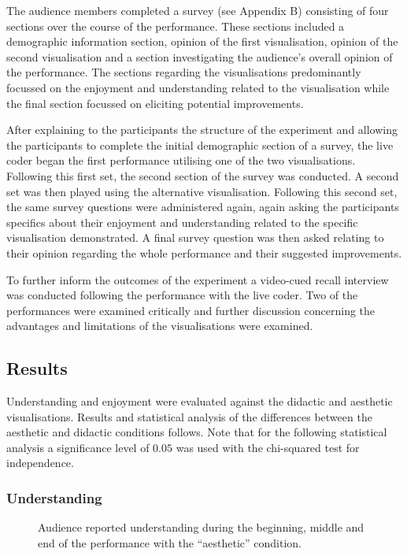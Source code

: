\documentclass{sig-alternate}
\begin{document}
The audience members completed a survey (see Appendix B) consisting of four sections over the course of the performance. These sections included a demographic information section, opinion of the first visualisation, opinion of the second visualisation and a section investigating the audience's overall opinion of the performance. The sections regarding the visualisations predominantly focussed on the enjoyment and understanding related to the visualisation while the final section focussed on eliciting potential improvements.

After explaining to the participants the structure of the experiment and allowing the participants to complete the initial demographic section of a survey, the live coder began the first performance utilising one of the two visualisations. Following this first set, the second section of the survey was conducted. A second set was then played using the alternative visualisation. Following this second set, the same survey questions were administered again, again asking the participants specifics about their enjoyment and understanding related to the specific visualisation demonstrated. A final survey question was then asked relating to their opinion regarding the whole performance and their suggested improvements.

To further inform the outcomes of the experiment a video-cued recall interview was conducted following the performance with the live coder. Two of the performances were examined critically and further discussion concerning the advantages and limitations of the visualisations were examined.

\subsection{Results}

Understanding and enjoyment were evaluated against the didactic and aesthetic visualisations. Results and statistical analysis of the differences between the aesthetic and didactic conditions follows. Note that for the following statistical analysis a significance level of $0.05$ was used with the chi-squared test for independence.

\subsubsection{Understanding}

\begin{figure}
\centering
{}
\caption{Audience reported understanding during the beginning, middle and end of the performance with the ``aesthetic'' condition.}
\label{fig:aesthetic-understanding}
\end{figure}
\end{document}
